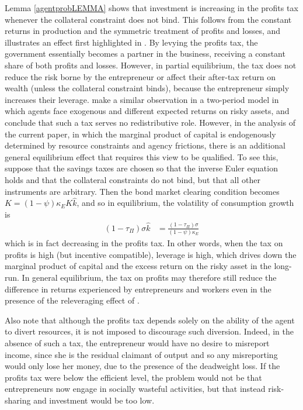 \documentclass[11pt]{article}
\theoremstyle{plain}
\theoremstyle{definition} %
\begin{document}
Lemma \ref{agentprobLEMMA} shows that investment is increasing in the profits tax whenever the collateral constraint does not bind. This follows from the constant returns in production and the symmetric treatment of profits and losses, and illustrates an effect first highlighted in \cite{domar_proportional_1944}. By levying the profits tax, the government essentially becomes a partner in the business, receiving a constant share of both profits and losses. However, in partial equilibrium, the tax does not reduce the risk borne by the entrepreneur or affect their after-tax return on wealth (unless the collateral constraint binds), because the entrepreneur simply increases their leverage. \cite{boadway_optimal_2021} make a similar observation in a two-period model in which agents face exogenous and different expected returns on risky assets, and conclude that such a tax serves no redistributive role. However, in the analysis of the current paper, in which the marginal product of capital is endogenously determined by resource constraints and agency frictions, there is an additional general equilibrium effect that requires this view to be qualified. To see this, suppose that the savings taxes are chosen so that the inverse Euler equation holds and that the collateral constraints do not bind, but that all other instruments are arbitrary. Then the bond market clearing condition becomes $K = (1 - \psi) \kappa_E K \hat{k}$, and so in equilibrium, the volatility of consumption growth is
\begin{align*}
(1 - \tau_{\Pi}) \sigma \hat{k} & = \frac{(1-\tau_{\Pi}) \sigma}{(1-\psi) \kappa_E}
\end{align*}
which is in fact decreasing in the profits tax. In other words, when the tax on profits is high (but incentive compatible), leverage is high, which drives down the marginal product of capital and the excess return on the risky asset in the long-run. In general equilibrium, the tax on profits may therefore still reduce the difference in returns experienced by entrepreneurs and workers even in the presence of the releveraging effect of \cite{domar_proportional_1944}.

Also note that although the profits tax depends solely on the ability of the agent to divert resources, it is not imposed to discourage such diversion. Indeed, in the absence of such a tax, the entrepreneur would have no desire to misreport income, since she is the residual claimant of output and so any misreporting would only lose her money, due to the presence of the deadweight loss. If the profits tax were below the efficient level, the problem would not be that entrepreneurs now engage in socially wasteful activities, but that instead risk-sharing and investment would be too low. 
\end{document}
